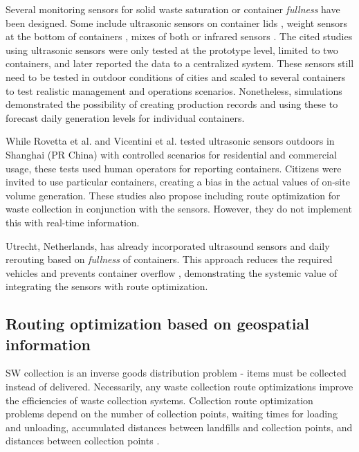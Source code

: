\documentclass[authoryear,preprint,review,doubleblind, 12pt]{elsarticle}
\begin{document}
    Several monitoring sensors for solid waste saturation or container \textit{fullness} have been designed. Some include ultrasonic sensors on container lids \citep{Chaudhari2018, Joshi2022, Karthik2021, Mahajan2017, Ramson2017}, weight sensors at the bottom of containers \citep{Rovetta2009}, mixes of both \citep{Ali2020, Vicentini2009} or infrared sensors \citep{Singh2016}. The cited studies using ultrasonic sensors were only tested at the prototype level, limited to two containers, and later reported the data to a centralized system. These sensors still need to be tested in outdoor conditions of cities and scaled to several containers to test realistic management and operations scenarios. Nonetheless, \citet{Ali2020} simulations demonstrated the possibility of creating production records and using these to forecast daily generation levels for individual containers.

    While Rovetta et al. and Vicentini et al. tested ultrasonic sensors outdoors in Shanghai (PR China) with controlled scenarios for residential and commercial usage, these tests used human operators for reporting containers. Citizens were invited to use particular containers, creating a bias in the actual values of on-site volume generation. These studies also propose including route optimization for waste collection in conjunction with the sensors. However, they do not implement this with real-time information.

   Utrecht, Netherlands, has already incorporated ultrasound sensors and daily rerouting based on \textit{fullness} of containers. This approach reduces the required vehicles and prevents container overflow \citep{utrechtUndergroundContainersMunicipality2021}, demonstrating the systemic value of integrating the sensors with route optimization.

\subsection{Routing optimization based on geospatial information}
    \label{subsubsec:routing}
    SW collection is an inverse goods distribution problem - items must be collected instead of delivered. Necessarily, any waste collection route optimizations improve the efficiencies of waste collection systems. Collection route optimization problems depend on the number of collection points, waiting times for loading and unloading, accumulated distances between landfills and collection points, and distances between collection points \citep{Sarmah2019}.
\end{document}
